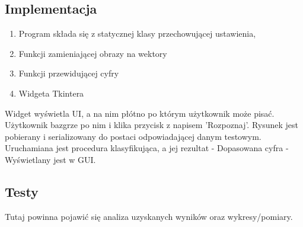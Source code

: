 \documentclass[12pt,a4paper]{article}
\begin{document}
\subsection*{Implementacja}
\begin{enumerate}
	\item Program składa się z statycznej klasy przechowującej ustawienia,
	\item Funkcji zamieniającej obrazy na wektory
	\item Funkcji przewidującej cyfry
	\item Widgeta Tkintera
\end{enumerate}

Widget wyświetla UI, a na nim płótno po którym użytkownik może pisać.
Użytkownik bazgrze po nim i klika przycisk z napisem 'Rozpoznaj'. Rysunek jest pobierany i
serializowany do postaci odpowiadającej danym testowym. Uruchamiana jest procedura klasyfikująca, a jej
rezultat - Dopasowana cyfra - Wyświetlany jest w GUI.
\subsection*{Testy}
Tutaj powinna pojawić się analiza uzyskanych wyników oraz wykresy/pomiary.
\end{document}

